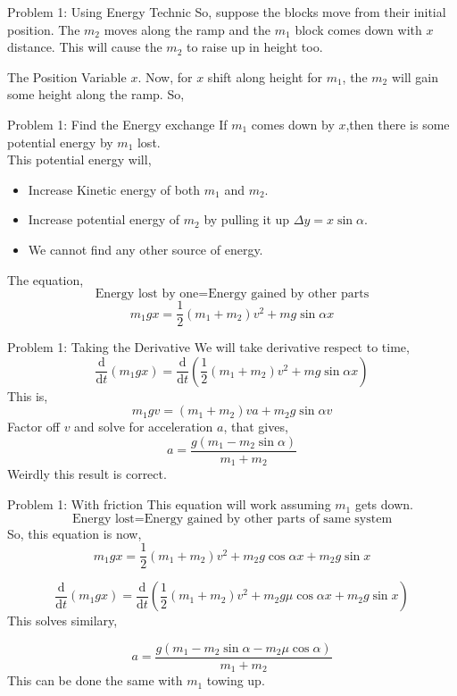 \documentclass[9pt]{memoir}
\newcommand{\draw}[3]{ \begin{figure}[hbt!] \centering
 \fontsize{35pt}{20pt}\selectfont \resizebox{#1 \textwidth}{!}{
{#2.pdf_tex}}\caption{#3} \label{#3} \end{figure} }
\begin{document}
\begin{frame}
    {Problem 1: Using Energy Technic}
    So, suppose the blocks move from their initial position. The $m_2$ moves along the ramp and the $m_1$ block comes down with $x$ distance. This will cause the $m_2$ to raise up in height too. 
    \draw{0.5}{prob1-1}{} 
\end{frame}


\begin{frame}
    {The Position Variable $x$.}
    Now, for $x$ shift along height for $m_1$, the $m_2$ will gain some height along the ramp. So,

        
  
    
\end{frame}


\begin{frame}
    {Problem 1: Find the Energy exchange}
    If $m_1$ comes down by $x$,then there is some potential energy by $m_1$ lost. \\
    This potential energy will, 
    \begin{itemize}
        \item Increase Kinetic energy of both $m_1$ and $m_2$. 
        \item Increase potential energy of $m_2$ by pulling it up $\Delta y = x \sin \alpha$. 
        \item We cannot find any other source of energy. 
    \end{itemize}
   The equation, 
   \[ \text{Energy lost by one} = \text{Energy gained by other parts} \]
   \[ m_1 g x = \frac{1}{2 }\left( m_1 + m_2 \right) v^2 + mg \sin\alpha x  \]
   
\end{frame}


\begin{frame}
    {Problem 1: Taking the Derivative}
    We will take derivative respect to time, 
    \[ \frac{\mathrm{d} }{\mathrm{d} t} \left( m_1 g x \right)  
    =
\frac{\mathrm{d} }{\mathrm{d} t}\left( \frac{1}{2} \left( m_1 + m_2 \right) v^2 + mg \sin \alpha x \right)          \]
This is, 
\[ m_1 g v = \left( m_1 +m_2  \right) v a + m_2 g \sin \alpha v \]
Factor off $v$ and solve for acceleration $a$, that gives, 
\[ \boxed{a = \frac{g \left( m_1 - m_2 \sin \alpha \right) }{m_1 + m_2}} \]
Weirdly this result is correct.
\end{frame}
    


\begin{frame}
    {Problem 1: With friction}
This equation will work assuming $m_1$ gets down.    \[ \text{Energy lost} = \text{Energy gained by other parts of same system} \]
So, this equation is now, 
\[ m_1 g x = \frac{1}{2 } \left( m_1 + m_2 \right)  v^2 + m_2 g \cos \alpha x + m_2 g \sin x \]

\[ \frac{\mathrm{d} }{\mathrm{d} t} (m_1 g x) = \frac{\mathrm{d} }{\mathrm{d} t} \left(\frac{1}{2 } \left( m_1 + m_2 \right)  v^2 + m_2 g \mu \cos \alpha x + m_2 g \sin x \right) \]
   This solves similary, 
   
\[ \boxed{a = \frac{g \left( m_1 - m_2 \sin \alpha  - m_2 \mu \cos \alpha \right) }{m_1 + m_2}} \] 
This can be done the same with $m_1$ towing up.
\end{frame}
\end{document}
